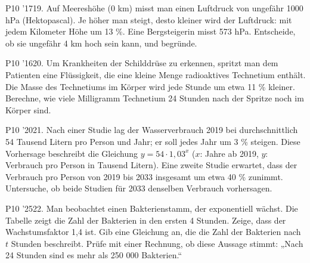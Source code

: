 \documentclass[11pt]{article}
\begin{document}
\pfgruppe{}
\begin{pfaufg}{P10 ’17}{19.}{}
Auf Meereshöhe (0 km) misst man einen Luftdruck von ungefähr 1000 hPa (Hektopascal). Je höher man steigt, desto kleiner wird der Luftdruck: mit jedem Kilometer Höhe um 13 \%. Eine Bergsteigerin misst 573 hPa. Entscheide, ob sie ungefähr 4 km hoch sein kann, und begründe.
\par\smallskip\noindent {}\par
{}
\end{pfaufg}
\pfgruppe{}
\begin{pfaufg}{P10 ’16}{\llap{\textasteriskcentered\,}20.}{}
Um Krankheiten der Schilddrüse zu erkennen, spritzt man dem Patienten eine Flüssigkeit, die eine kleine Menge radioaktives Technetium enthält. Die Masse des Technetiums im Körper wird jede Stunde um etwa 11 \% kleiner. Berechne, wie viele Milligramm Technetium 24 Stunden nach der Spritze noch im Körper sind.
\par\smallskip\noindent {}\par
{}
\end{pfaufg}
\pfgruppe{}
\begin{pfaufg}{P10 ’20}{\llap{\textasteriskcentered\,}21.}{}
Nach einer Studie lag der Wasserverbrauch 2019 bei durchschnittlich 54 Tausend Litern pro Person und Jahr; er soll jedes Jahr um 3 \% steigen. Diese Vorhersage beschreibt die Gleichung $y = 54\cdot 1{,}03^{x}$ ($x$: Jahre ab 2019, $y$: Verbrauch pro Person in Tausend Litern). Eine zweite Studie erwartet, dass der Verbrauch pro Person von 2019 bis 2033 insgesamt um etwa 40 \% zunimmt. Untersuche, ob beide Studien für 2033 denselben Verbrauch vorhersagen.
\end{pfaufg}
\pfgruppe{}
\begin{pfaufg}{P10 ’25}{\llap{\textasteriskcentered\,}22.}{}
Man beobachtet einen Bakterienstamm, der exponentiell wächst. Die Tabelle zeigt die Zahl der Bakterien in den ersten 4 Stunden. Zeige, dass der Wachstumsfaktor 1,4 ist. Gib eine Gleichung an, die die Zahl der Bakterien nach $t$ Stunden beschreibt. Prüfe mit einer Rechnung, ob diese Aussage stimmt: „Nach 24 Stunden sind es mehr als 250 000 Bakterien.“
\par\smallskip\noindent {}\par
{}
\end{pfaufg}
\end{document}
